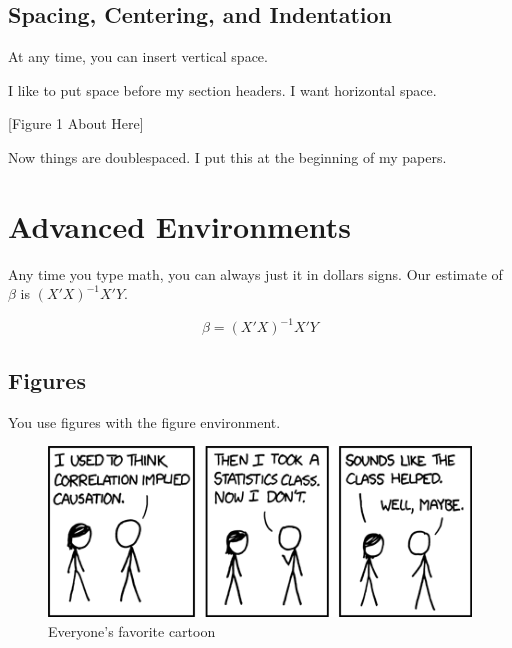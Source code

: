 \documentclass[11pt]{article} %
\begin{document}

\vspace{4mm}
\subsection{Spacing, Centering, and Indentation}

At any time, you can insert vertical space. 

\vspace{4mm}


I like to put space before my section headers. \hspace{10mm} I want horizontal space. 


\begin{center}
[Figure 1 About Here]
\end{center}

\doublespace

Now things are doublespaced. I put this at the beginning of my papers. 

\vspace{4mm}
\section{Advanced Environments}

Any time you type math, you can always just it in dollars signs. Our estimate of $\beta$ is $(X'X)^{-1}X'Y$.

\begin{equation}
\beta = (X'X)^{-1}X'Y
\end{equation}

\vspace{4mm}
\subsection{Figures}

You use figures with the figure environment. 

\begin{figure}[h!]
\caption{Everyone's favorite cartoon}
\vspace{6mm}
\centerline{\includegraphics[scale=.5]{correlation.png}}
\end{figure}
\vspace{4mm}
\end{document}
